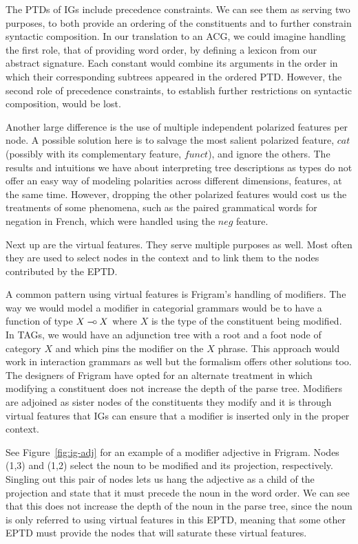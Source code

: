 The PTDs of IGs include precedence constraints. We can see them as
serving two purposes, to both provide an ordering of the constituents
and to further constrain syntactic composition. In our translation to an
ACG, we could imagine handling the first role, that of providing word
order, by defining a lexicon from our abstract signature. Each constant
would combine its arguments in the order in which their corresponding
subtrees appeared in the ordered PTD. However, the second role of
precedence constraints, to establish further restrictions on syntactic
composition, would be lost.

Another large difference is the use of multiple independent polarized
features per node. A possible solution here is to salvage the most
salient polarized feature, $cat$ (possibly with its complementary
feature, $funct$), and ignore the others. The results and intuitions we
have about interpreting tree descriptions as types do not offer an easy
way of modeling polarities across different dimensions, features, at the
same time. However, dropping the other polarized features would cost us
the treatments of some phenomena, such as the paired grammatical words
for negation in French, which were handled using the $neg$ feature.

Next up are the virtual features. They serve multiple purposes as
well. Most often they are used to select nodes in the context and to
link them to the nodes contributed by the EPTD.

A common pattern using virtual features is Frigram's handling of
modifiers. The way we would model a modifier in categorial grammars
would be to have a function of type $X \mathbin{{-}\mkern-3.5mu{\circ}} X$ where $X$ is the type of
the constituent being modified. In TAGs, we would have an adjunction
tree with a root and a foot node of category $X$ and which pins the
modifier on the $X$ phrase. This approach would work in interaction
grammars as well but the formalism offers other solutions too. The
designers of Frigram have opted for an alternate treatment in which
modifying a constituent does not increase the depth of the parse
tree. Modifiers are adjoined as sister nodes of the constituents they
modify and it is through virtual features that IGs can ensure that a
modifier is inserted only in the proper context.

See Figure~\ref{fig:ig-adj} for an example of a modifier adjective in
Frigram. Nodes (1,3) and (1,2) select the noun to be modified and its
projection, respectively. Singling out this pair of nodes lets us hang
the adjective as a child of the projection and state that it must
precede the noun in the word order. We can see that this does not
increase the depth of the noun in the parse tree, since the noun is only
referred to using virtual features in this EPTD, meaning that some other
EPTD must provide the nodes that will saturate these virtual features.

